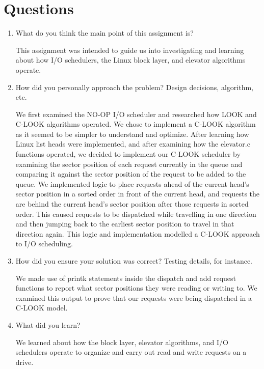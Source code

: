 \documentclass[letterpaper,10pt,fleqn]{article}
\begin{document}
\section*{Questions}
\begin{enumerate}
\item What do you think the main point of this assignment is?

This assignment was intended to guide us into investigating and learning about how I/O schedulers, the Linux block layer, and elevator algorithms operate.

\item How did you personally approach the problem? Design decisions, algorithm, etc. 

We first examined the NO-OP I/O scheduler and researched how LOOK and C-LOOK algorithms operated. We chose to implement a C-LOOK algorithm as it seemed to be simpler to understand and optimize. After learning how Linux list heads were implemented, and after examining how the elevator.c functions operated, we decided to implement our C-LOOK scheduler by examining the sector position of each request currently in the queue and comparing it against the sector position of the request to be added to the queue. We implemented logic to place requests ahead of the current head's sector position in a sorted order in front of the current head, and requests the are behind the current head's sector position after those requests in sorted order. This caused requests to be dispatched while travelling in one direction and then jumping back to the earliest sector position to travel in that direction again. This logic and implementation modelled a C-LOOK approach to I/O scheduling.

\item How did you ensure your solution was correct? Testing details, for instance. 

We made use of printk statements inside the dispatch and add request functions to report what sector positions they were reading or writing to. We examined this output to prove that our requests were being dispatched in a C-LOOK model.

\item What did you learn? 

We learned about how the block layer, elevator algorithms, and I/O schedulers operate to organize and carry out read and write requests on a drive.

\end{enumerate}

\begin{thebibliography}{9}

\end{thebibliography}
\end{document}
